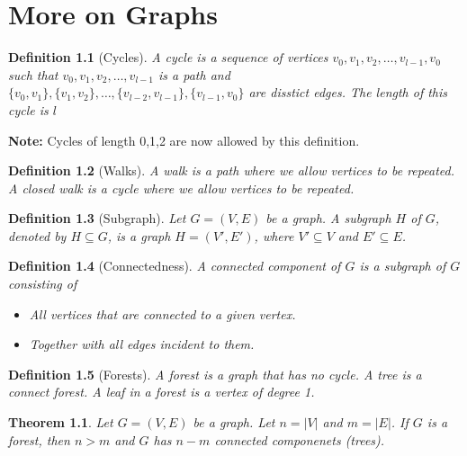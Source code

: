 \documentclass[openany]{report}
\newtheorem{theorem}{Theorem}[section]
\newtheorem{definition}{Definition}[section]
\begin{document}
\setcounter{chapter}{19}

\chapter{More on Graphs}
\begin{definition}[Cycles]
    A \emph{cycle} is a sequence of vertices $v_0, v_1,v_2, \ldots, v_{l-1}, v_0$ such that $v_0, v_1,v_2, \ldots, v_{l-1}$ is a path and $\{v_0,v_1\},\{v_1,v_2\}, \ldots,\{v_{l-2},v_{l-1}\}, \{v_{l-1}, v_0\}$ are disstict edges. The \emph{length} of this cycle is $l$
\end{definition}
\begin{center}
    \textbf{Note:} Cycles of length 0,1,2 are now allowed by this definition.
\end{center}
\begin{definition}[Walks]
    A \emph{walk} is a path where we allow vertices to be repeated. A \emph{closed walk} is a cycle where we allow vertices to be repeated.
\end{definition}
\begin{definition}[Subgraph]
    Let $G = (V,E)$ be a graph. A \emph{subgraph} $H$ of $G$, denoted by $H \subseteq G$, is a graph $H = (V', E')$, where $V' \subseteq V$ and $E' \subseteq E$.
\end{definition}
\begin{definition}[Connectedness]
    A \emph{connected component} of $G$ is a subgraph of $G$ consisting of 
    \begin{itemize}
        \item All vertices that are connected to a given vertex.
        \item Together with all edges incident to them.
    \end{itemize}
\end{definition}
\begin{definition}[Forests]
    A \emph{forest} is a graph that has no cycle. A \emph{tree} is a connect forest. A \emph{leaf} in a forest is a vertex of degree 1.
\end{definition}
\begin{theorem}
    Let $G = (V,E)$ be a graph. Let $n = |V|$ and $m = |E|$. If $G$ is a forest, then $n > m$ and $G$ has $n-m$ connected componenets (trees).
\end{theorem}
\end{document}
